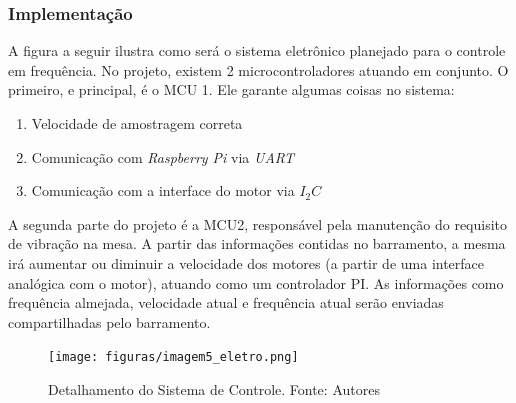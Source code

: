 \subsubsection{Implementação}
A figura a seguir ilustra como será o sistema eletrônico planejado para o controle em frequência. No projeto, existem 2 microcontroladores atuando em conjunto. O primeiro, e principal, é o MCU 1. Ele garante algumas coisas no sistema:
\begin{enumerate}
\item Velocidade de amostragem correta
\item Comunicação com \textit{Raspberry Pi} via \textit{UART}
\item Comunicação com a interface do motor via \textit{$I_{2} C$}
\end{enumerate}
A segunda parte do projeto é a MCU2, responsável pela manutenção do requisito de vibração na mesa. A partir das informações contidas no barramento, a mesma irá aumentar ou diminuir a velocidade dos motores (a partir de uma interface analógica com o motor), atuando como um controlador PI. As informações como frequência almejada, velocidade atual e frequência atual serão enviadas compartilhadas pelo barramento.
\begin{figure}[H]
\centering
\texttt{[image: figuras/imagem5\_eletro.png]}
\caption{Detalhamento do Sistema de Controle. Fonte: Autores}
\label{fig:det_control_system}
\end{figure}